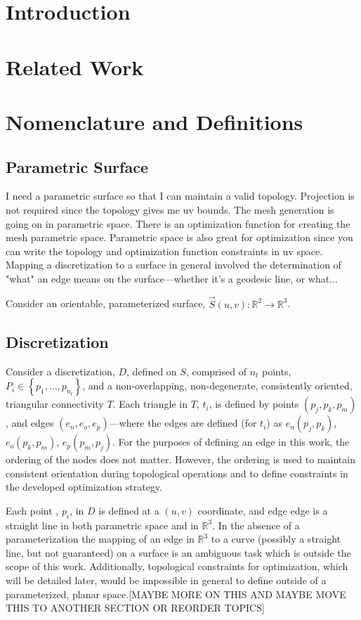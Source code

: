 \documentclass[11pt]{article}
\begin{document}
\section{Introduction}
\section{Related Work}
\section{Nomenclature and Definitions}
\subsection{Parametric Surface}
I need a parametric surface so that I can maintain a valid topology.
Projection is not required since the topology gives me uv bounds. The
mesh generation is going on in parametric space. There is an
optimization function for creating the mesh parametric space. Parametric
space is also great for optimization since you can write the topology
and optimization function constraints in uv space. Mapping a
discretization to a surface in general involved the determination of
"what" an edge means on the surface---whether it's a geodesic line, or
what...

Consider an orientable, parameterized surface, $\vec{S}\left(u,v\right)
  : {\mathbb R}^2 \rightarrow {\mathbb R}^3$.
\subsection{Discretization}
Consider a discretization, $D$, defined on $S$, comprised of $n_t$
points, $P_i \in \left\{p_1,...,p_{n_t} \right\}$, and a
non-overlapping, non-degenerate, consistently oriented, triangular
connectivity $T$. Each triangle in $T$, $t_i$, is defined by points
$\left(p_j, p_k, p_m\right)$, and edges $\left(e_n, e_o,
e_p\right)$---where the edges are defined (for $t_i$) as $e_n
\left(p_j, p_k\right)$, $e_o \left(p_k, p_m\right)$, $e_p \left(p_m,
p_j\right)$. For the purposes of defining an edge in this work, the
ordering of the nodes does not matter. However, the ordering is used to
maintain consistent orientation during topological operations and to
define constraints in the developed optimization strategy.

Each point , $p_i$, in $D$ is defined at a $\left(u,v\right)$
coordinate, and edge edge is a straight line in both parametric space
and in ${\mathbb R}^3$. In the absence of a parameterization the mapping
of an edge in ${\mathbb R}^3$ to a curve (possibly a straight line, but
not guaranteed) on a surface is an ambiguous task which is outside
the scope of this work. Additionally, topological constraints for
optimization, which will be detailed later, would be impossible in
general to define outside of a parameterized, planar space.[MAYBE MORE
ON THIS AND MAYBE MOVE THIS TO ANOTHER SECTION OR REORDER TOPICS]
\end{document}
